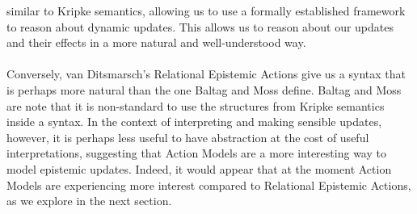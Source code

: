 \documentclass[12pt, a4paper, twoside]{article}
\begin{document}
similar to Kripke semantics, allowing us to use a formally established framework
to reason about dynamic updates.
This allows us to reason about our updates and their effects in a more natural
and well-understood way.\\
\\
Conversely, van Ditsmarsch's Relational Epistemic Actions give us a syntax that
is perhaps more natural than the one Baltag and Moss define.
Baltag and Moss are note that it is non-standard to use the structures from
Kripke semantics inside a syntax.
In the context of interpreting and making sensible updates, however, it is
perhaps less useful to have abstraction at the cost of useful interpretations,
suggesting that Action Models are a more interesting way to model epistemic
updates.
Indeed, it would appear that at the moment Action Models are experiencing more
interest compared to Relational Epistemic Actions, as we explore in the next
section.
\end{document}
